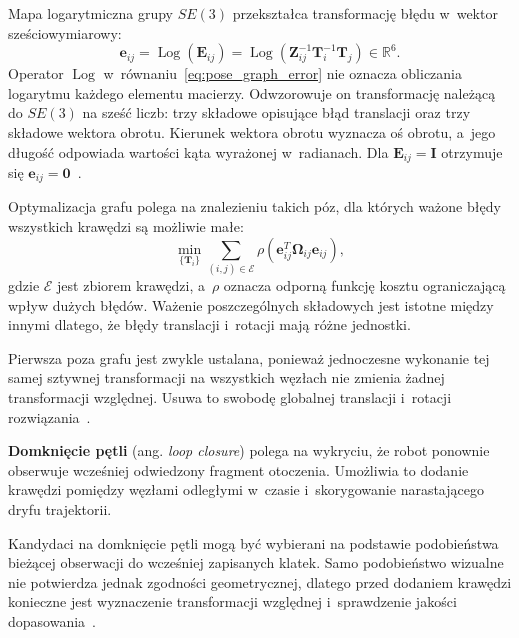 Mapa logarytmiczna grupy $SE(3)$ przekształca transformację błędu w~wektor sześciowymiarowy:
\begin{equation}
    \mathbf{e}_{ij}
    =
    \operatorname{Log}\!\left(\mathbf{E}_{ij}\right)
    =
    \operatorname{Log}\!\left(
        \mathbf{Z}_{ij}^{-1}
        \mathbf{T}_i^{-1}
        \mathbf{T}_j
    \right)
    \in\mathbb{R}^{6}.
    \label{eq:pose_graph_error}
\end{equation}
Operator $\operatorname{Log}$ w~równaniu~\eqref{eq:pose_graph_error} nie oznacza obliczania logarytmu każdego elementu macierzy. Odwzorowuje on transformację należącą do $SE(3)$ na sześć liczb: trzy składowe opisujące błąd translacji oraz trzy składowe wektora obrotu. Kierunek wektora obrotu wyznacza oś obrotu, a~jego długość odpowiada wartości kąta wyrażonej w~radianach. Dla $\mathbf{E}_{ij}=\mathbf{I}$ otrzymuje się $\mathbf{e}_{ij}=\mathbf{0}$~\cite{blanco2021se3}.

Optymalizacja grafu polega na znalezieniu takich póz, dla których ważone błędy wszystkich krawędzi są możliwie małe:
\begin{equation}
    \min_{\{\mathbf{T}_i\}}
    \sum_{(i,j)\in\mathcal{E}}
    \rho\!\left(
        \mathbf{e}_{ij}^{T}
        \boldsymbol{\Omega}_{ij}
        \mathbf{e}_{ij}
    \right),
    \label{eq:pose_graph}
\end{equation}
gdzie $\mathcal{E}$ jest zbiorem krawędzi, a~$\rho$ oznacza odporną funkcję kosztu ograniczającą wpływ dużych błędów. Ważenie poszczególnych składowych jest istotne między innymi dlatego, że błędy translacji i~rotacji mają różne jednostki.

Pierwsza poza grafu jest zwykle ustalana, ponieważ jednoczesne wykonanie tej samej sztywnej transformacji na wszystkich węzłach nie zmienia żadnej transformacji względnej. Usuwa to swobodę globalnej translacji i~rotacji rozwiązania~\cite{grisetti2010graph}.

\textbf{Domknięcie pętli} (ang. \textit{loop closure}) polega na wykryciu, że robot ponownie obserwuje wcześniej odwiedzony fragment otoczenia. Umożliwia to dodanie krawędzi pomiędzy węzłami odległymi w~czasie i~skorygowanie narastającego dryfu trajektorii.

Kandydaci na domknięcie pętli mogą być wybierani na podstawie podobieństwa bieżącej obserwacji do wcześniej zapisanych klatek. Samo podobieństwo wizualne nie potwierdza jednak zgodności geometrycznej, dlatego przed dodaniem krawędzi konieczne jest wyznaczenie transformacji względnej i~sprawdzenie jakości dopasowania~\cite{murartal2015orbslam}.

